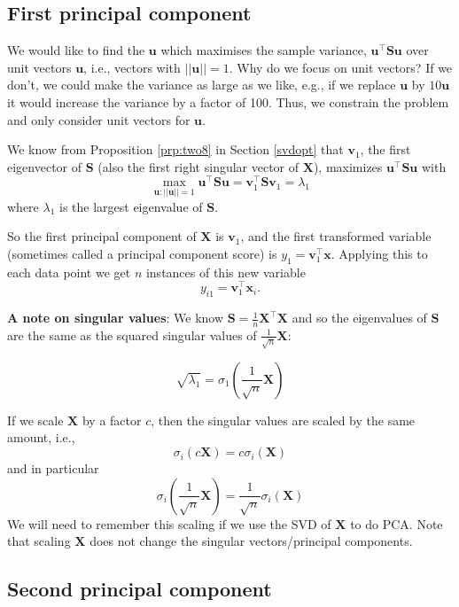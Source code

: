 \documentclass[
]{book}
\theoremstyle{definition}
\theoremstyle{definition}
\theoremstyle{definition}
\theoremstyle{definition}
\theoremstyle{remark}
\begin{document}
\subsection{First principal component}\label{first-principal-component}

We would like to find the \(\mathbf u\) which maximises the sample variance, \(\mathbf u^\top \mathbf S\mathbf u\) over unit vectors \(\mathbf u\), i.e., vectors with \(||\mathbf u||=1\). Why do we focus on unit vectors? If we don't, we could make the variance as large as we like, e.g., if we replace \(\mathbf u\) by \(10\mathbf u\) it would increase the variance by a factor of 100. Thus, we constrain the problem and only consider unit vectors for \(\mathbf u\).

We know from Proposition \ref{prp:two8} in Section \ref{svdopt} that \(\mathbf v_1\), the first eigenvector of \(\mathbf S\) (also the first right singular vector of \(\mathbf X\)), maximizes \(\mathbf u^\top \mathbf S\mathbf u\) with
\[  \max_{\mathbf u: ||\mathbf u||=1} \mathbf u^\top \mathbf S\mathbf u= \mathbf v_1^\top \mathbf S\mathbf v_1 =\lambda_1\]
where \(\lambda_1\) is the largest eigenvalue of \(\mathbf S\).

So the first principal component of \(\mathbf X\) is \(\mathbf v_1\), and the first transformed variable (sometimes called a principal component score) is \(y_1 = \mathbf v_1 ^\top \mathbf x\).
Applying this to each data point we get \(n\) instances of this new variable
\[y_{i1} = \mathbf v_1 ^\top \mathbf x_i.\]

\textbf{A note on singular values}: We know \(\mathbf S= \frac{1}{n}\mathbf X^\top\mathbf X\) and so the eigenvalues of \(\mathbf S\) are the same as the squared singular values of \(\frac{1}{\sqrt{n}} \mathbf X\):

\[\sqrt{\lambda_1} = \sigma_1\left(\frac{1}{\sqrt{n}} \mathbf X\right)\]

If we scale \(\mathbf X\) by a factor \(c\), then the singular values are scaled by the same amount, i.e.,
\[\sigma_i(c\mathbf X)=c\sigma_i(\mathbf X)\]
and in particular
\[ \sigma_i\left(\frac{1}{\sqrt{n}} \mathbf X\right) = \frac{1}{\sqrt{n}} \sigma_i(\mathbf X)\]
We will need to remember this scaling if we use the SVD of \(\mathbf X\) to do PCA. Note that scaling \(\mathbf X\) does not change the singular vectors/principal components.

\subsection{Second principal component}\label{second-principal-component}
\end{document}

